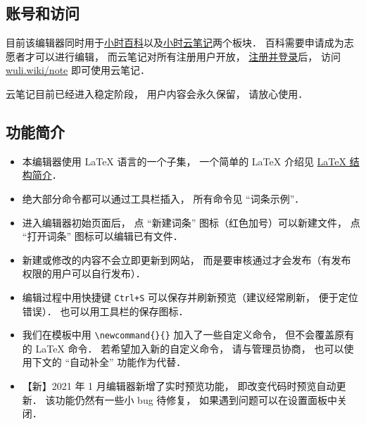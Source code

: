 \subsection{账号和访问}
目前该编辑器同时用于\href{http://wuli.wiki/book/}{小时百科}以及\href{http://wuli.wiki/note/}{小时云笔记}两个板块． 百科需要申请成为志愿者才可以进行编辑， 而云笔记对所有注册用户开放， \href{https://wuli.wiki/authentication/login}{注册并登录}后， 访问 \href{http://wuli.wiki/note/}{wuli.wiki/note} 即可使用云笔记．

云笔记目前已经进入稳定阶段， 用户内容会永久保留， 请放心使用．

\subsection{功能简介}

\begin{itemize}
\item 本编辑器使用 LaTeX 语言的一个子集， 一个简单的 LaTeX 介绍见 \href{https://wuli.wiki/online/latxIn.html}{LaTeX 结构简介}．
\item 绝大部分命令都可以通过工具栏插入， 所有命令见 “词条示例”．
\item 进入编辑器初始页面后， 点 “新建词条” 图标（红色加号）可以新建文件， 点 “打开词条” 图标可以编辑已有文件．
\item 新建或修改的内容不会立即更新到网站， 而是要审核通过才会发布（有发布权限的用户可以自行发布）．
\item 编辑过程中用快捷键 \verb|Ctrl+S| 可以保存并刷新预览（建议经常刷新， 便于定位错误）． 也可以用工具栏的保存图标．
\item 我们在模板中用 \verb|\newcommand{}{}| 加入了一些自定义命令， 但不会覆盖原有的 LaTeX 命令． 若希望加入新的自定义命令， 请与管理员协商， 也可以使用下文的 “自动补全” 功能作为代替．
\item 【新】2021 年 1 月编辑器新增了实时预览功能， 即改变代码时预览自动更新． 该功能仍然有一些小 bug 待修复， 如果遇到问题可以在设置面板中关闭．
\end{itemize}

